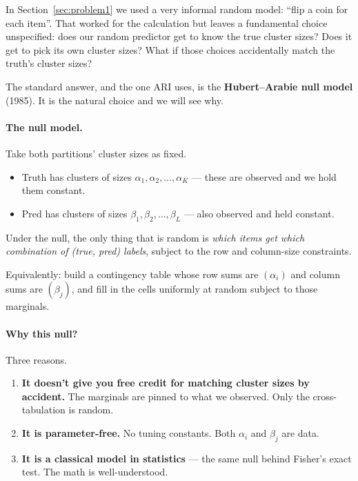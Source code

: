 \documentclass[11pt]{article}
\begin{document}
In Section~\ref{sec:problem1} we used a very informal random model: ``flip
a coin for each item''. That worked for the calculation but leaves a
fundamental choice unspecified: does our random predictor get to know the
true cluster sizes? Does it get to pick its own cluster sizes? What if
those choices accidentally match the truth's cluster sizes?

The standard answer, and the one ARI uses, is the
\textbf{Hubert--Arabie null model} (1985). It is the natural choice and we
will see why.

\paragraph{The null model.}
Take both partitions' cluster sizes as fixed.
\begin{itemize}\setlength\itemsep{1pt}
  \item Truth has clusters of sizes $\alpha_1, \alpha_2, \ldots, \alpha_K$
        --- these are observed and we hold them constant.
  \item Pred has clusters of sizes $\beta_1, \beta_2, \ldots, \beta_L$
        --- also observed and held constant.
\end{itemize}
Under the null, the only thing that is random is \emph{which items get
which combination of (true, pred) labels}, subject to the row and
column-size constraints.

Equivalently: build a contingency table whose row sums are
$(\alpha_i)$ and column sums are $(\beta_j)$, and fill in the cells
uniformly at random subject to those marginals.

\paragraph{Why this null?}
Three reasons.
\begin{enumerate}\setlength\itemsep{1pt}
  \item \textbf{It doesn't give you free credit for matching cluster
        sizes by accident.} The marginals are pinned to what we observed.
        Only the cross-tabulation is random.
  \item \textbf{It is parameter-free.} No tuning constants. Both
        $\alpha_i$ and $\beta_j$ are data.
  \item \textbf{It is a classical model in statistics} --- the same null
        behind Fisher's exact test. The math is well-understood.
\end{enumerate}
\end{document}
